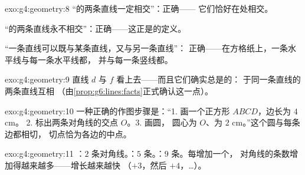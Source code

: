 \begin{solution}{exo:g4:geometry:8}
“的两条直线一定相交”：正确——
它们恰好在处相交。

“的两条直线永不相交”：正确——这正是的定义。

“一条直线可以既与某条直线，又与另一条直线”：
正确——在方格纸上，一条水平线与每一条水平线都，
并与每一条竖线都。
\end{solution}

\begin{solution}{exo:g4:geometry:9}
直线 $d$ 与 $f$ 看上去——而且它们确实总是的：
于同一条直线的两条直线互相
（由\cref{prop:g6:lines:facts}正式确认这一点）。
\end{solution}

\begin{solution}{exo:g4:geometry:10}
一种正确的作图步骤是：“1. 画一个正方形 $ABCD$，边长为 $4$ cm。
2. 标出两条对角线的交点 $O$。3. 画圆，
圆心为 $O$、为 $2$ cm。”这个圆与每条边都相切，
切点恰为各边的中点。
\end{solution}

\begin{solution}{exo:g4:geometry:11}
：$2$ 条对角线。：$5$ 条。：$9$ 条。每增加一个，
对角线的条数增加得越来越多——增长越来越快
（$+3$，然后 $+4$，\dots）。
\end{solution}
